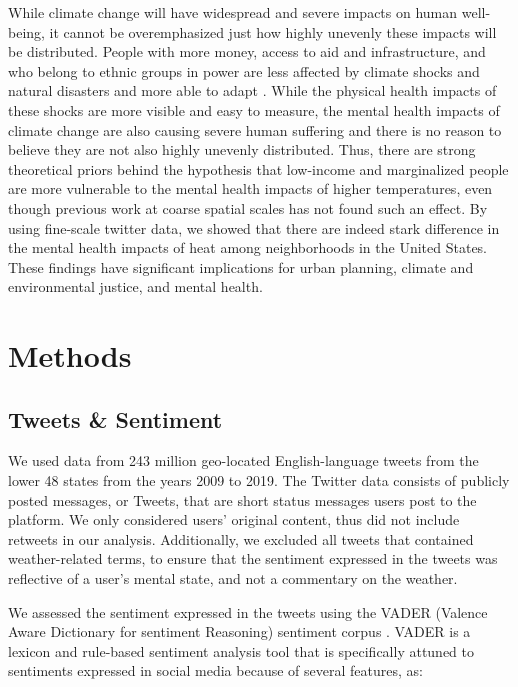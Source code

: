 \documentclass[fleqn,10pt]{wlscirep}
\begin{document}
While climate change will have widespread and severe impacts on human well-being, it cannot be overemphasized just how highly unevenly these impacts will be distributed.  People with more money, access to aid and infrastructure, and who belong to ethnic groups in power are less affected by climate shocks and natural disasters and more able to adapt \cite{bullard2012wrong}.  While the physical health impacts of these shocks are more visible and easy to measure, the mental health impacts of climate change are also causing severe human suffering and there is no reason to believe they are not also highly unevenly distributed.  Thus, there are strong theoretical priors behind the hypothesis that low-income and marginalized people are more vulnerable to the mental health impacts of higher temperatures, even though previous work at coarse spatial scales has not found such an effect.  By using fine-scale twitter data, we showed that there are indeed stark difference in the mental health impacts of heat among neighborhoods in the United States.  These findings have significant implications for urban planning, climate and environmental justice, and mental health.

\section*{Methods}
\subsection*{Tweets \& Sentiment}
We used data from 243 million geo-located English-language tweets from the lower 48 states from the years 2009 to 2019.  The Twitter data consists of publicly posted messages, or Tweets, that are short status messages users post to the platform.  We only considered users’ original content, thus did not include retweets in our analysis.  Additionally, we excluded all tweets that contained weather-related terms, to ensure that the sentiment expressed in the tweets was reflective of a user's mental state, and not a commentary on the weather.

We assessed the sentiment expressed in the tweets using the VADER (Valence Aware Dictionary for sentiment Reasoning) sentiment corpus \cite{gilbert_vader_2014}. VADER is a lexicon and rule-based sentiment analysis tool that is specifically attuned to sentiments expressed in social media because of several features, as:
\end{document}
